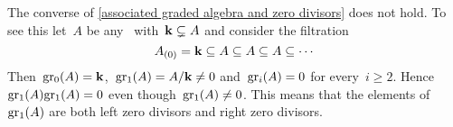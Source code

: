 \begin{remark}
  The converse of \cref{associated graded algebra and zero divisors} does not hold.
  To see this let~$A$ be any~\algebra{$\kf$} with~$\mathbf{k} \subsetneq A$ and consider the filtration
  \[
    A_{(0)}
    =
    \mathbf{k}
    \subseteq
    A
    \subseteq
    A
    \subseteq
    A
    \subseteq
    \dotsb
  \]
  Then~$\gr[0](A) = \kf$,~$\gr[1](A) = A/{\kf} \neq 0$ and~$\gr[i](A) = 0$ for every~$i \geq 2$.
  Hence~$\gr[1](A) \gr[1](A) = 0$ even though~$\gr[1](A) \neq 0$.
  This means that the elements of~$\gr[1](A)$ are both left zero divisors and right zero divisors.
\end{remark}
% 
% 
% 
% 
% 
% 
% 
% 
% 
% 
% 
% 
% 
% 
% 

